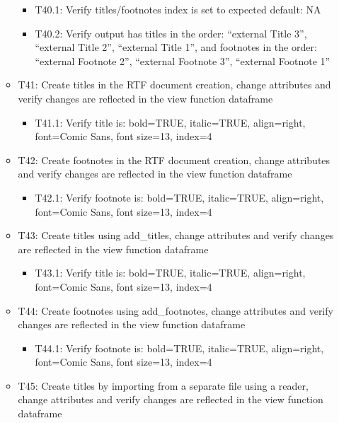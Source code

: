 \documentclass[]{article}
\providecommand{\tightlist}{%
  \setlength{\itemsep}{0pt}\setlength{\parskip}{0pt}}
\begin{document}
\begin{itemize}
\begin{itemize}
    \begin{itemize}
    \tightlist
    \item
      T40.1: Verify titles/footnotes index is set to expected default:
      NA
    \item
      T40.2: Verify output has titles in the order: ``external Title
      3'', ``external Title 2'', ``external Title 1'', and footnotes in
      the order: ``external Footnote 2'', ``external Footnote 3'',
      ``external Footnote 1''
    \end{itemize}
  \item
    T41: Create titles in the RTF document creation, change attributes
    and verify changes are reflected in the view function dataframe

    \begin{itemize}
    \tightlist
    \item
      T41.1: Verify title is: bold=TRUE, italic=TRUE, align=right,
      font=Comic Sans, font size=13, index=4
    \end{itemize}
  \item
    T42: Create footnotes in the RTF document creation, change
    attributes and verify changes are reflected in the view function
    dataframe

    \begin{itemize}
    \tightlist
    \item
      T42.1: Verify footnote is: bold=TRUE, italic=TRUE, align=right,
      font=Comic Sans, font size=13, index=4
    \end{itemize}
  \item
    T43: Create titles using add\_titles, change attributes and verify
    changes are reflected in the view function dataframe

    \begin{itemize}
    \tightlist
    \item
      T43.1: Verify title is: bold=TRUE, italic=TRUE, align=right,
      font=Comic Sans, font size=13, index=4
    \end{itemize}
  \item
    T44: Create footnotes using add\_footnotes, change attributes and
    verify changes are reflected in the view function dataframe

    \begin{itemize}
    \tightlist
    \item
      T44.1: Verify footnote is: bold=TRUE, italic=TRUE, align=right,
      font=Comic Sans, font size=13, index=4
    \end{itemize}
  \item
    T45: Create titles by importing from a separate file using a reader,
    change attributes and verify changes are reflected in the view
    function dataframe


\end{itemize}
\end{itemize}
\end{document}
